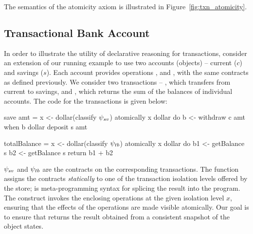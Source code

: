 \noindent The semantics of the atomicity axiom is illustrated in
Figure~\ref{fig:txn_atomicity}.

\subsection{Transactional Bank Account}

In order to illustrate the utility of declarative reasoning for transactions,
consider an extension of our running example to use two accounts (objects) --
current ($c$) and savings ($s$). Each account provides operations
,  and , with the same contracts as
defined previously. We consider two transactions -- , which
transfers  from current to savings, and , which
returns the sum of the balances of individual accounts. The \quelea code for the
transactions is given below:

\hspace{1em}
\begin{minipage}[t]{0.4\columnwidth}
\begin{codehaskell}
save amt =
  x <- dollar(classify $\psi_{sv}$)
  atomically x dollar do
    b <- withdraw c amt
    when b dollar deposit s amt
\end{codehaskell}
\end{minipage}
\hfill
\begin{minipage}[t]{0.4\columnwidth}
\begin{codehaskell}
totalBalance =
  x <- dollar(classify $\psi_{tb}$)
  atomically x dollar do
    b1 <- getBalance s
    b2 <- getBalance s
    return b1 + b2
\end{codehaskell}
\end{minipage}
\hspace{1em}

$\psi_{sv}$ and $\psi_{tb}$ are the contracts on the corresponding
transactions. The function  assigns the contracts
\emph{statically} to one of the transaction isolation levels offered by the
store; \cf{\$()} is meta-programming syntax for splicing the result into the
program. The  construct invokes the enclosing operations at the
given isolation level $x$, ensuring that the effects of the operations are made
visible atomically. Our goal is to ensure that  returns the
result obtained from a consistent snapshot of the object states.

